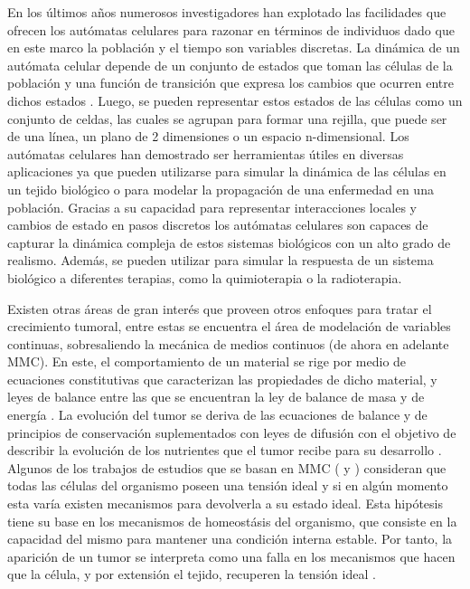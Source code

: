 \hspace{.1cm}En los últimos años numerosos investigadores han explotado las facilidades que ofrecen los autómatas celulares para razonar en términos de individuos dado que en este marco la población y el tiempo son variables discretas. La dinámica de un autómata celular depende de un conjunto de estados que toman las células de la población y una función de transición que expresa los cambios que ocurren entre dichos estados \cite{viabarre2019}. Luego, se pueden representar estos estados de las células como un conjunto de celdas, las cuales se agrupan para formar una rejilla, que puede ser de una línea, un plano de 2 dimensiones o un espacio n-dimensional. Los autómatas celulares han demostrado ser herramientas útiles en diversas aplicaciones ya que pueden utilizarse para simular la dinámica de las células en un tejido biológico o para modelar la propagación de una enfermedad en una población. Gracias a su capacidad para representar interacciones locales y cambios de estado en pasos discretos los autómatas celulares son capaces de capturar la dinámica compleja de estos sistemas biológicos con un alto grado de realismo. Además, se pueden utilizar para simular la respuesta de un sistema biológico a diferentes terapias, como la quimioterapia o la radioterapia.

\hspace{.1cm}Existen otras áreas de gran interés que proveen otros enfoques para tratar el crecimiento tumoral, entre estas se encuentra el \'area de modelaci\'on de variables continuas, sobresaliendo la mecánica de medios continuos (de ahora en adelante MMC). En este, el comportamiento de un material se rige por medio de ecuaciones constitutivas que caracterizan las propiedades de dicho material, y leyes de balance entre las que se encuentran la ley de balance de masa y de energía \cite{viabarre2019}. La evolución del tumor se deriva de las ecuaciones de balance y de principios de conservación suplementados con leyes de difusión con el objetivo de describir la evolución de los nutrientes que el tumor recibe para su desarrollo \cite{anderson}. Algunos de los trabajos de estudios que se basan en MMC (\cite{rejniak} y \cite{ruanxiaoca}) consideran que todas las células del organismo poseen una tensión ideal y si en algún momento esta varía existen mecanismos para devolverla a su estado ideal. Esta hipótesis tiene su base en los mecanismos de homeost\'asis del organismo, que consiste en la capacidad del mismo para mantener una condición interna estable. Por tanto, la aparición de un tumor se interpreta como una falla en los mecanismos que hacen que la célula, y por extensión el tejido, recuperen la tensión ideal \cite{watts}.

